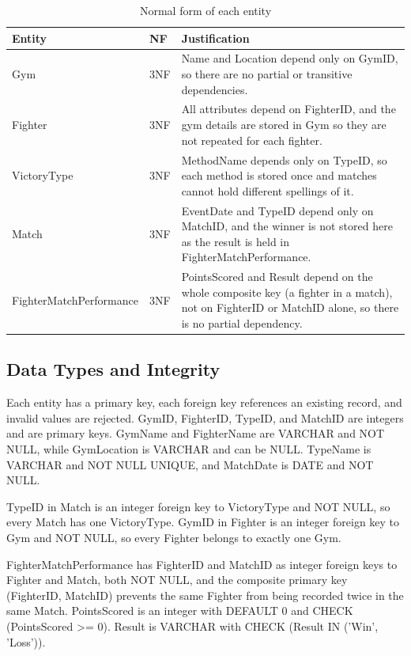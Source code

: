 \documentclass[conference,9pt]{IEEEtran}
\begin{document}
\begin{table}[H]
\caption{Normal form of each entity}
\label{tab:nf}
\centering
\footnotesize
\setlength{\tabcolsep}{3pt}
\begin{tabular}{|p{}|p{}|p{}|}
\hline
\textbf{Entity} & \textbf{NF} & \textbf{Justification} \\ \hline
Gym & 3NF & Name and Location depend only on GymID, so there are no partial or transitive dependencies. \\ \hline
Fighter & 3NF & All attributes depend on FighterID, and the gym details are stored in Gym so they are not repeated for each fighter. \\ \hline
VictoryType & 3NF & MethodName depends only on TypeID, so each method is stored once and matches cannot hold different spellings of it. \\ \hline
Match & 3NF & EventDate and TypeID depend only on MatchID, and the winner is not stored here as the result is held in FighterMatchPerformance. \\ \hline
Fighter\-Match\-Performance & 3NF & PointsScored and Result depend on the whole composite key (a fighter in a match), not on FighterID or MatchID alone, so there is no partial dependency. \\ \hline
\end{tabular}
\end{table}

\subsection{Data Types and Integrity}

Each entity has a primary key, each foreign key references an existing record, and invalid values are rejected. GymID, FighterID, TypeID, and MatchID are integers and are primary keys. GymName and FighterName are VARCHAR and NOT NULL, while GymLocation is VARCHAR and can be NULL. TypeName is VARCHAR and NOT NULL UNIQUE, and MatchDate is DATE and NOT NULL.

TypeID in Match is an integer foreign key to VictoryType and NOT NULL, so every Match has one VictoryType. GymID in Fighter is an integer foreign key to Gym and NOT NULL, so every Fighter belongs to exactly one Gym.

FighterMatchPerformance has FighterID and MatchID as integer foreign keys to Fighter and Match, both NOT NULL, and the composite primary key (FighterID, MatchID) prevents the same Fighter from being recorded twice in the same Match. PointsScored is an integer with DEFAULT 0 and CHECK (PointsScored >= 0). Result is VARCHAR with CHECK (Result IN ('Win', 'Loss')).
\end{document}
